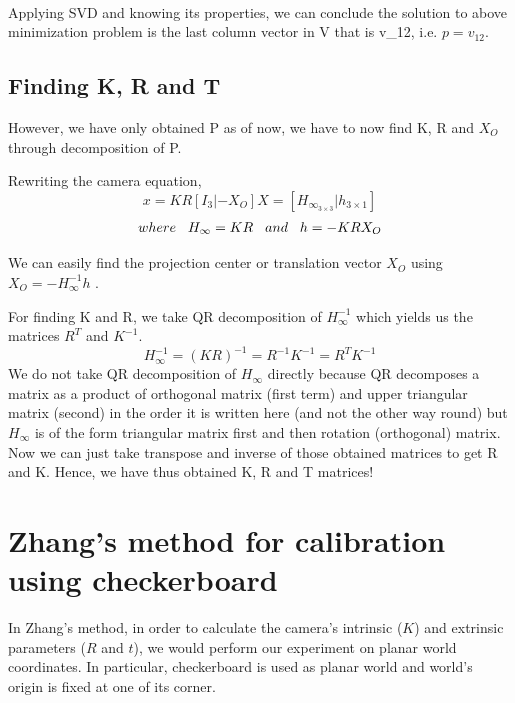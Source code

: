 \documentclass[a4paper]{article}
\begin{document}
\\Applying SVD and knowing its properties, we can conclude the solution to above minimization problem is the last column vector in V that is {v_{12}},   i.e. $  p = v_{12} $.

\subsection{Finding K, R and T}
However, we have only obtained P as of now, we have to now find K, R and $X_{O}$ through decomposition of P.

Rewriting the camera equation,
\begin{equation*}
x= KR [I_{3}| - X_{O}]X = [H_{{\infty}_{3\times3}} | h_{3\times1}]
\label{eq7}
\end{equation*}
\begin{align*}
where \hspace{3mm} H_{\infty} = KR \hspace{3mm}  and \hspace{3mm} h = -K R X_{O}
\end{align*}

We can easily find the projection center or translation vector $X_{O}$ using $X_{O} = -H_{\infty}^{-1} h $ .

For finding K and R, we take QR decomposition of $H_{\infty}^{-1}$ which yields us the matrices $R^T$ and $K^{-1}$. 
\begin{equation*}
H_{\infty}^{-1} =  (KR)^{-1} = R^{-1} K^{-1} = R^{T} K^{-1}
\end{equation*}
We do not take QR decomposition of $H_{\infty}$ directly because QR decomposes a matrix as a product of orthogonal matrix (first term) and upper triangular matrix (second) in the order it is written here (and not the other way round) but $H_{\infty}$ is of the form triangular matrix first and then rotation (orthogonal) matrix. Now we can just take transpose and inverse of those obtained matrices to get R and K. Hence, we have thus obtained K, R and T matrices!

\section{Zhang's method for calibration using checkerboard}

In Zhang's method, in order to calculate the camera's intrinsic ($K$) and extrinsic parameters ($R$ and $t$), we would perform our experiment on planar world coordinates. In particular, checkerboard is used as planar world and world's origin is fixed at one of its corner.  
\end{document}
